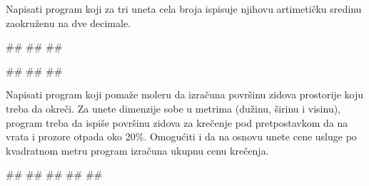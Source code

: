 \begin{Exercise}[label=v1.1_09] 
Napisati program koji za tri uneta cela broja ispisuje njihovu artimetičku sredinu zaokruženu na dve decimale.\\
\begin{miditest}
\begin{upotreba}{1}
#\naslovInt#
##
##
\end{upotreba}
\end{miditest}
\begin{miditest}
\begin{upotreba}{2}
#\naslovInt#
##
##
\end{upotreba}
\end{miditest}

\end{Exercise}
\begin{Answer}[ref=v1.1_09]
\end{Answer}







\begin{Exercise}[label=p1.1_04] 
Napisati program koji pomaže moleru da izračuna površinu zidova prostorije koju treba da okreči. Za unete dimenzije sobe u metrima (dužinu, širinu i visinu), program treba da  ispiše površinu zidova za krečenje pod pretpostavkom da na vrata i prozore otpada oko 20\%. Omogućiti i da na osnovu unete cene usluge po kvadratnom metru program izračuna ukupnu cenu krečenja.\\
\begin{miditest}
\begin{upotreba}{1}
#\naslovInt#
##
##
##
##
\end{upotreba}
\end{miditest}
\end{Exercise}
\begin{Answer}[ref=p1.1_04]
\end{Answer}







